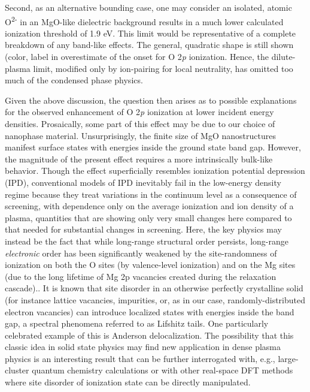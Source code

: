 Second, as an alternative bounding case, one may consider an isolated,
atomic O\textsuperscript{2-} in an MgO-like dielectric background
results in a much lower calculated ionization threshold of 1.9 eV. This
limit would be representative of a complete breakdown of any band-like
effects. The general, quadratic shape is still shown (color, label in
overestimate of the onset for O 2\emph{p} ionization. Hence, the
dilute-plasma limit, modified only by ion-pairing for local neutrality,
has omitted too much of the condensed phase physics.

\FloatBarrier

Given the above discussion, the question then arises as to possible
explanations for the observed enhancement of O 2\emph{p} ionization at
lower incident energy densities. Prosaically, some part of this effect
may be due to our choice of nanophase material. Unsurprisingly, the
finite size of MgO nanostructures manifest surface states with energies
inside the ground state band gap.  However, the magnitude of the
present effect requires a more intrinsically bulk-like behavior. Though
the effect superficially resembles ionization potential depression
(IPD), conventional models of IPD inevitably fail in the low-energy
density regime because they treat variations in the continuum level as a
consequence of screening, with dependence only on the average ionization
and ion density of a plasma, quantities that are showing only very small
changes here compared to that needed for substantial changes in
screening. \cite{ciricosta2016measurements, vinko2014density} Here, the key physics may instead be the fact that
while long-range structural order persists, long-range \emph{electronic}
order has been significantly weakened by the site-randomness of
ionization on both the O sites (by valence-level ionization) and on the
Mg sites (due to the long lifetime of Mg 2p vacancies created during the
relaxation cascade).. It is known that site disorder in an otherwise
perfectly crystalline solid (for instance lattice vacancies, impurities,
or, as in our case, randomly-distributed electron vacancies) can
introduce localized states with energies inside the band gap, a spectral
phenomena referred to as Lifshitz tails. \cite{nieuwenhuizen1989trapping} One particularly
celebrated example of this is Anderson delocalization. \cite{de1998delocalization} The
possibility that this classic idea in solid state physics may find new
application in dense plasma physics is an interesting result that can be
further interrogated with, e.g., large-cluster quantum chemistry
calculations or with other real-space DFT methods where site disorder of
ionization state can be directly manipulated.


